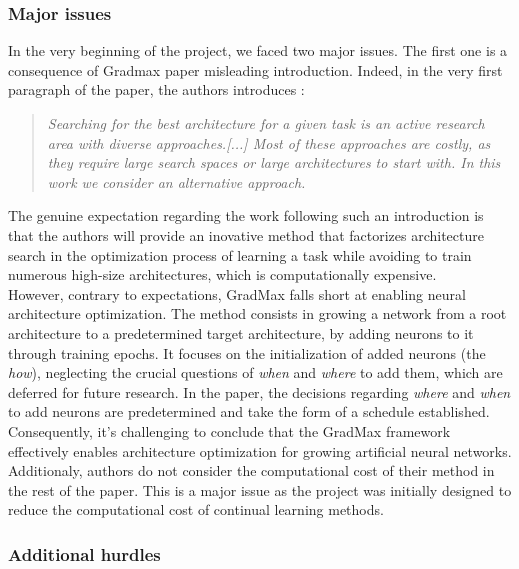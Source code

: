 \documentclass{article}
\begin{document}
\subsubsection{Major issues}

In the very beginning of the project, we faced two major issues. The first one is a consequence of Gradmax paper misleading introduction. Indeed, in the very first paragraph of the paper, the authors introduces :
\begin{quote}
    \itshape
    \centering
    Searching for the best architecture for a given task is an active research area with diverse approaches.[...] Most of these approaches are costly, as they require large search spaces or large architectures to start with. In this work we consider an alternative approach.
\end{quote}

\noindent
The genuine expectation regarding the work following such an introduction is that the authors will provide an inovative method that factorizes architecture search in the optimization process of learning a task while avoiding to train numerous high-size architectures, which is computationally expensive.\\

\noindent
However, contrary to expectations, GradMax falls short at enabling neural architecture optimization. The method consists in growing a network from a root architecture to a predetermined target architecture, by adding neurons to it through training epochs. It focuses on the initialization of added neurons (the \textit{how}), neglecting the crucial questions of \textit{when} and \textit{where} to add them, which are deferred for future research. In the paper, the decisions regarding \textit{where} and \textit{when} to add neurons are predetermined and take the form of a schedule established. Consequently, it's challenging to conclude that the GradMax framework effectively enables architecture optimization for growing artificial neural networks.\\

\noindent
Additionaly, authors do not consider the computational cost of their method in the rest of the paper. This is a major issue as the project was initially designed to reduce the computational cost of continual learning methods.

\subsubsection{Additional hurdles}
\end{document}
